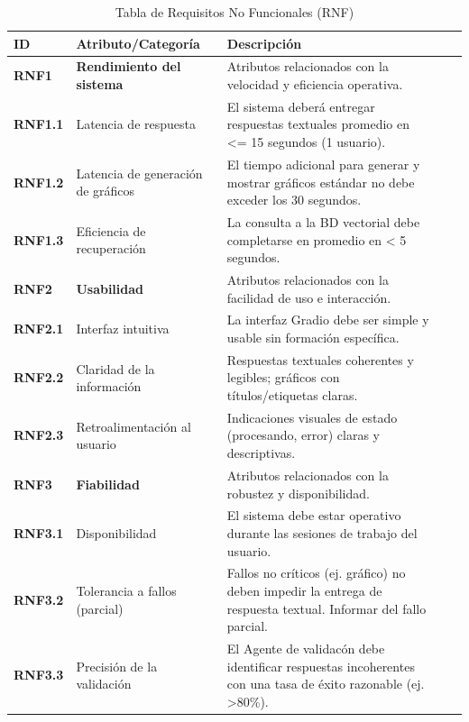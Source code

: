 \begin{longtable}{@{}l >{\raggedright\arraybackslash}p{4cm} >{\raggedright\arraybackslash}p{7cm} l l@{}}
	\caption{Tabla de Requisitos No Funcionales (RNF)} \label{tab:requisitos_no_funcionales} \\
	\textbf{ID} & \textbf{Atributo/Categoría} & \textbf{Descripción} \\
	\midrule
	
	\textbf{RNF1} & \textbf{Rendimiento del sistema} & Atributos relacionados con la velocidad y eficiencia operativa. \\
	\textbf{RNF1.1} & Latencia de respuesta & El sistema deberá entregar respuestas textuales promedio en <= 15 segundos (1 usuario). \\
	\textbf{RNF1.2} & Latencia de generación de gráficos & El tiempo adicional para generar y mostrar gráficos estándar no debe exceder los 30 segundos. \\
	\textbf{RNF1.3} & Eficiencia de recuperación & La consulta a la BD vectorial debe completarse en promedio en < 5 segundos. \\
	\midrule
	
	\textbf{RNF2} & \textbf{Usabilidad} & Atributos relacionados con la facilidad de uso e interacción. \\
	\textbf{RNF2.1} & Interfaz intuitiva & La interfaz Gradio debe ser simple y usable sin formación específica. \\
	\textbf{RNF2.2} & Claridad de la información & Respuestas textuales coherentes y legibles; gráficos con títulos/etiquetas claras. \\
	\textbf{RNF2.3} & Retroalimentación al usuario & Indicaciones visuales de estado (procesando, error) claras y descriptivas. \\
	\midrule
	
	\textbf{RNF3} & \textbf{Fiabilidad} & Atributos relacionados con la robustez y disponibilidad. \\
	\textbf{RNF3.1} & Disponibilidad & El sistema debe estar operativo durante las sesiones de trabajo del usuario. \\
	\textbf{RNF3.2} & Tolerancia a fallos (parcial) & Fallos no críticos (ej. gráfico) no deben impedir la entrega de respuesta textual. Informar del fallo parcial. \\
	\textbf{RNF3.3} & Precisión de la validación & El Agente de validacón debe identificar respuestas incoherentes con una tasa de éxito razonable (ej. >80\%). \\
	\midrule
	

\end{longtable}
